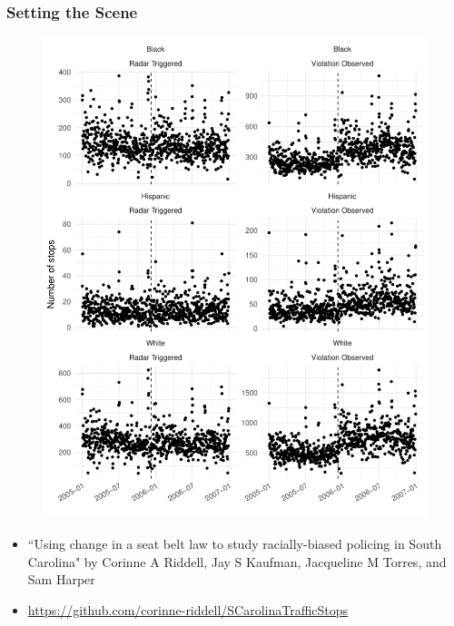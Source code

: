 \documentclass{beamer}
\begin{document}
\begin{frame}
\begin{figure}
\end{figure}

\end{frame}

\begin{frame}
\frametitle{Setting the Scene}


\begin{multicols}{2}

\begin{figure}
\includegraphics[scale=.25]{figures/stopData}
\end{figure}

\columnbreak

\begin{itemize}

\item ``Using change in a seat belt law to study racially-biased policing in South Carolina" by Corinne A Riddell, Jay S Kaufman, Jacqueline M Torres, and Sam Harper

\item \url{https://github.com/corinne-riddell/SCarolinaTrafficStops}

\end{itemize}
\end{multicols}


\end{frame}
\end{document}
